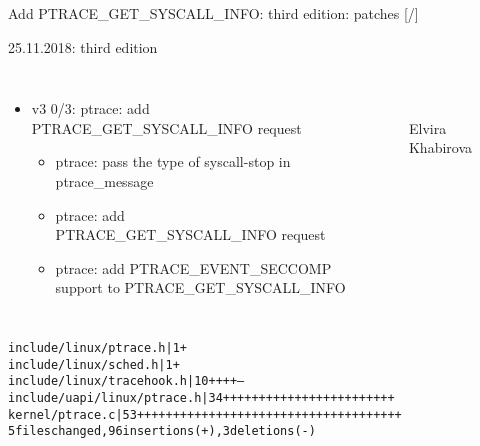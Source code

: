 \documentclass[unicode,aspectratio=169,xcolor={table,dvipsnames,usernames}]{beamer}
\begin{document}
\begin{frame}[fragile]{Add PTRACE\_GET\_SYSCALL\_INFO: third edition: patches \hfill [\insertframenumber/\inserttotalframenumber]}
\Large
\begin{block}{25.11.2018: third edition}
\large
\begin{columns}
	\column{8.5cm}
\begin{itemize}
	\item v3 0/3: ptrace: add PTRACE\_GET\_SYSCALL\_INFO request
	\begin{itemize}
		\item ptrace: pass the type of syscall-stop in ptrace\_message
		\item ptrace: add PTRACE\_GET\_SYSCALL\_INFO request
		\item ptrace: add PTRACE\_EVENT\_SECCOMP support to PTRACE\_GET\_SYSCALL\_INFO
	\end{itemize}
\end{itemize}
	\column{4.5cm}
		\begin{figure}
			\centering
			 \\
			Elvira Khabirova
		\end{figure}
\end{columns}
\begin{alltt}
\scriptsize
 include/linux/ptrace.h      |  1 +
 include/linux/sched.h       |  1 +
 include/linux/tracehook.h   | 10 ++++---
 include/uapi/linux/ptrace.h | 34 ++++++++++++++++++++++++
 kernel/ptrace.c             | 53 +++++++++++++++++++++++++++++++++++++
 5 files changed, 96 insertions(+), 3 deletions(-)
\end{alltt}
\end{block}
\end{frame}
\end{document}

